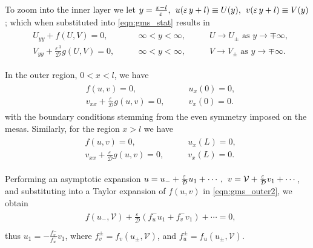\documentclass[a4paper,10pt]{article}
\newcommand{\Ep}{\ensuremath{\varepsilon\,}}
\newcommand{\DD}{\ensuremath{\mathcal{D}}}
\newcommand{\VV}{\ensuremath{\mathcal{V}}}
\begin{document}
To zoom into the inner layer we let $y=\frac{x-l}{\Ep},\hspace{1ex} u(\Ep y+l)\equiv U(y),\hspace{1ex} v(\Ep y+l)\equiv V(y)$; which when substituted into \eqref{eqn:gms_stat} results in
% 
\begin{equation}
\label{eqn:gms_layer}
\begin{split}
\begin{aligned}
	&U_{yy}+ f(U,V) =0,\qquad &\infty<y<\infty,\qquad &U\rightarrow U_{\pm} \text{ as } y\rightarrow\mp\infty,\\
	&V_{yy}+ \frac{\Ep^3}{\DD} g(U,V)=0,\qquad &\infty<y<\infty,\qquad &V\rightarrow V_{\pm} \text{ as } y\rightarrow\mp\infty.
\end{aligned}
\end{split}
\end{equation}
% 

In the outer region, $0<x<l$, we have
% 
\begin{equation*}
\begin{split}
\begin{aligned}
	&f(u,v) = 0,\qquad &u_x(0)=0,\\
	&v_{xx}+ \frac{\Ep}{\DD} g(u,v) = 0,\qquad &v_x(0)=0.
\end{aligned}
\end{split}
\end{equation*}
% 
with the boundary conditions stemming from the even symmetry imposed on the mesas. Similarly, for the region $x>l$ we have
% 
\begin{equation}
\label{eqn:gms_outer2}
\begin{split}
\begin{aligned}
	&f(u,v) = 0,\qquad &u_x(L)=0,\\
	&v_{xx} + \frac{\Ep}{\DD} g(u,v) = 0,\qquad &v_x(L)=0.
\end{aligned}
\end{split}
\end{equation}
% 

Performing an asymptotic expansion $u = u_- + \frac{\Ep}{\DD}u_1 + \cdots, \hspace{1ex} v = \VV + \frac{\Ep}{\DD}v_1 + \cdots$, and substituting into a Taylor expansion of $f(u,v)$ in \eqref{eqn:gms_outer2}, we obtain
% 
\begin{equation*}
\begin{split}
\begin{aligned}
	&f(u_-,\VV) + \frac{\Ep}{\DD}(f_u^-u_1 + f_v^-v_1) + \cdots = 0,\\
\end{aligned}
\end{split}
\end{equation*}
%
thus $u_1 = -\frac{f_v^-}{f_u^-}v_1$, where $f_v^{\pm} = f_v(u_{\pm},\VV)$, and  $f_u^{\pm} = f_u(u_{\pm},\VV)$.
\end{document}
